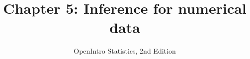 \documentclass[slidestop,compress,mathserif]{beamer}
\title[Chp 5: Inference for numerical data]{Chapter 5: Inference for numerical data}
\author{OpenIntro Statistics, 2nd Edition}
\date{}
\institute{}
\begin{document}


\begin{frame}[plain]

\titlepage

\end{frame}









\end{document}
